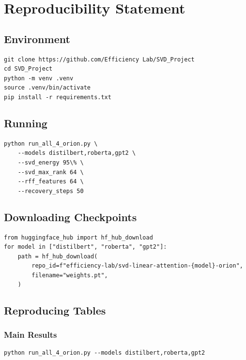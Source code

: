 
\section{Reproducibility Statement}

\subsection{Environment}

\begin{lstlisting}
git clone https://github.com/Efficiency Lab/SVD_Project
cd SVD_Project
python -m venv .venv
source .venv/bin/activate
pip install -r requirements.txt
\end{lstlisting}

\subsection{Running}

\begin{lstlisting}
python run_all_4_orion.py \
    --models distilbert,roberta,gpt2 \
    --svd_energy 95\% \
    --svd_max_rank 64 \
    --rff_features 64 \
    --recovery_steps 50
\end{lstlisting}

\subsection{Downloading Checkpoints}

\begin{lstlisting}
from huggingface_hub import hf_hub_download
for model in ["distilbert", "roberta", "gpt2"]:
    path = hf_hub_download(
        repo_id=f"efficiency-lab/svd-linear-attention-{model}-orion",
        filename="weights.pt",
    )
\end{lstlisting}

\subsection{Reproducing Tables}

\subsubsection{Main Results}

\begin{lstlisting}
python run_all_4_orion.py --models distilbert,roberta,gpt2
\end{lstlisting}

